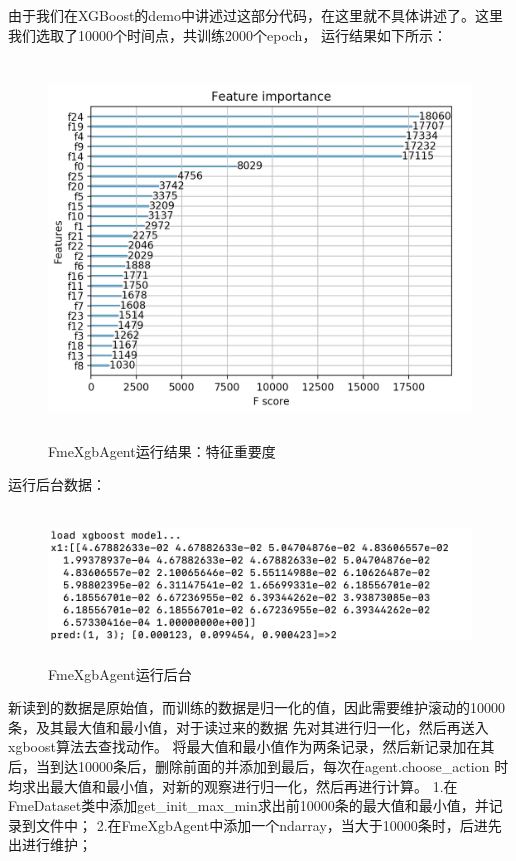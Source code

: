 \documentclass{article}
\begin{document}
由于我们在XGBoost的demo中讲述过这部分代码，在这里就不具体讲述了。这里我们选取了10000个时间点，共训练2000个epoch，
运行结果如下所示：
\begin{figure}[H]
    \caption{FmeXgbAgent运行结果：特征重要度}
    \label{f000095}
    \centering
    \includegraphics[height=10cm]{images/f000095}
\end{figure}
运行后台数据：
\begin{figure}[H]
    \caption{FmeXgbAgent运行后台}
    \label{f000096}
    \centering
    \includegraphics[height=4cm]{images/f000096}
\end{figure}





新读到的数据是原始值，而训练的数据是归一化的值，因此需要维护滚动的10000条，及其最大值和最小值，对于读过来的数据
先对其进行归一化，然后再送入xgboost算法去查找动作。
将最大值和最小值作为两条记录，然后新记录加在其后，当到达10000条后，删除前面的并添加到最后，每次在agent.choose\_action
时均求出最大值和最小值，对新的观察进行归一化，然后再进行计算。
1.在FmeDataset类中添加get\_init\_max\_min求出前10000条的最大值和最小值，并记录到文件中；
2.在FmeXgbAgent中添加一个ndarray，当大于10000条时，后进先出进行维护；
\end{document}
